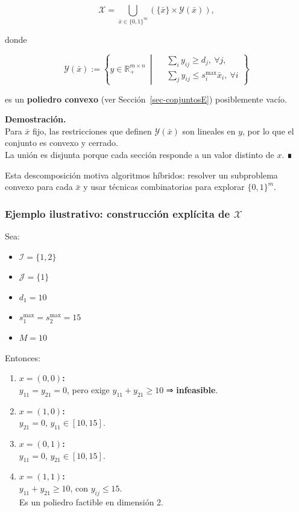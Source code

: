 \documentclass[
  spanish,
  us-letterpaper,
]{scrreprt}
\providecommand{\tightlist}{%
  \setlength{\itemsep}{0pt}\setlength{\parskip}{0pt}}
\numberwithin{equation}{section}
\begin{document}
\[
\mathcal{X}
=
\bigcup_{\bar{x} \in \{0,1\}^m}
\left(
\{\bar{x}\} \times \mathcal{Y}(\bar{x})
\right),
\]

donde

\[
\mathcal{Y}(\bar{x}) :=
\left\{
y \in \mathbb{R}_+^{m \times n}
\ \middle|\
\begin{aligned}
&\sum_i y_{ij} \ge d_j,\ \forall j, \\
&\sum_j y_{ij} \le s_i^{\max} \bar{x}_i,\ \forall i
\end{aligned}
\right\}
\]

es un \textbf{poliedro convexo} (ver Sección~\ref{sec-conjuntosE})
posiblemente vacío.

\textbf{Demostración.}\\
Para \(\bar{x}\) fijo, las restricciones que definen
\(\mathcal{Y}(\bar{x})\) son lineales en \(y\), por lo que el conjunto
es convexo y cerrado.\\
La unión es disjunta porque cada sección responde a un valor distinto de
\(x\). ∎

Esta descomposición motiva algoritmos híbridos: resolver un subproblema
convexo para cada \(\bar{x}\) y usar técnicas combinatorias para
explorar \(\{0,1\}^m\).

\subsubsection{\texorpdfstring{\textbf{Ejemplo ilustrativo: construcción
explícita de
\(\mathcal{X}\)}}{Ejemplo ilustrativo: construcción explícita de \textbackslash mathcal\{X\}}}\label{ejemplo-ilustrativo-construcciuxf3n-expluxedcita-de-mathcalx}

Sea:

\begin{itemize}
\tightlist
\item
  \(\mathcal{I} = \{1,2\}\)
\item
  \(\mathcal{J} = \{1\}\)\\
\item
  \(d_1 = 10\)\\
\item
  \(s_1^{\max} = s_2^{\max} = 15\)\\
\item
  \(M = 10\)
\end{itemize}

Entonces:

\begin{enumerate}
\def\labelenumi{\arabic{enumi}.}
\item
  \textbf{\(x=(0,0)\):}\\
  \(y_{11}=y_{21}=0\), pero exige \(y_{11}+y_{21} \ge 10\) ⇒
  \textbf{infeasible}.
\item
  \textbf{\(x=(1,0)\):}\\
  \(y_{21}=0\), \(y_{11}\in[10,15]\).
\item
  \textbf{\(x=(0,1)\):}\\
  \(y_{11}=0\), \(y_{21}\in[10,15]\).
\item
  \textbf{\(x=(1,1)\):}\\
  \(y_{11}+y_{21}\ge 10\), con \(y_{ij}\le 15\).\\
  Es un poliedro factible en dimensión 2.
\end{enumerate}
\end{document}

